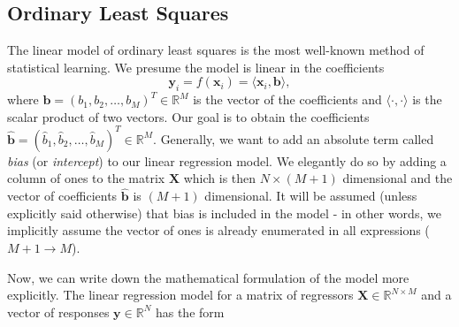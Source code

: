 \documentclass[11pt,oneside,czech,american]{book} %
\theoremstyle{plain}
\theoremstyle{definition}
\begin{document}
\subsection{Ordinary Least Squares}
The linear model of ordinary least squares is the most well-known method of statistical learning. We presume the model is linear in the coefficients
\begin{equation}
	\bm{y}_{i} = f(\bm{x}_{i})= \langle\bm{x}_{i}, \bm{b}\rangle,
\end{equation}
where $\bm{b}= (b_{1},b_{2},\dots,b_{M})^{T} \in \mathbb{R}^{M}$ is the vector of the coefficients and $\langle \cdot , \cdot \rangle$ is the scalar product of two vectors. Our goal is to obtain the coefficients $\bm{\hat{b}}= (\hat{b}_{1},\hat{b}_{2},\dots,\hat{b}_{M})^{T} \in \mathbb{R}^{M}$. Generally, we want to add an absolute term called \textit{bias} (or \textit{intercept}) to our linear regression model. We elegantly do so by adding a column of ones to the matrix  $\bm{X}$ which is then $N\times (M+1)$ dimensional and the vector of coefficients $\bm{\hat{b}}$ is $(M+1)$ dimensional. It will be assumed (unless explicitly said otherwise) that bias is included in the model - in other words, we implicitly assume the vector of ones is already enumerated in all expressions ($M+1 \rightarrow M$).

Now, we can write down the mathematical formulation of the model more explicitly. The linear regression model for a matrix of regressors $\bm{X} \in \mathbb{R}^{N \times M}$ and a vector of responses $\bm{y} \in \mathbb{R}^{N}$ has the form
\end{document}
